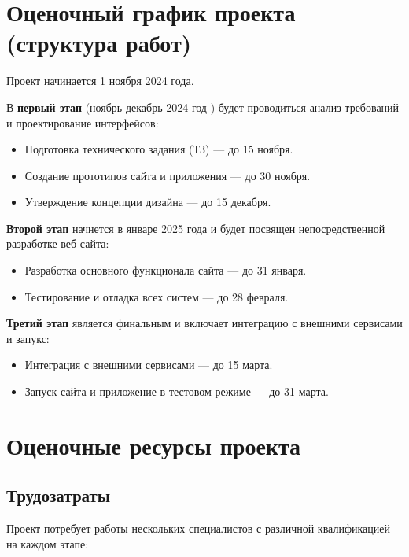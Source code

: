 \section{Оценочный график проекта (структура работ)}

Проект начинается 1 ноября 2024 года.

В \textbf{первый этап} (ноябрь-декабрь 2024 год
) будет проводиться анализ требований и проектирование интерфейсов:

\begin{itemize}
	\item Подготовка технического задания (ТЗ) --- до 15 ноября.
	\item Создание прототипов сайта и приложения --- до 30 ноября.
	\item Утверждение концепции дизайна --- до 15 декабря.
\end{itemize}

\textbf{Второй этап} начнется в январе 2025 года
и будет посвящен непосредственной разработке веб-сайта:

\begin{itemize}
	\item Разработка основного функционала сайта --- до 31 января.
	\item Тестирование и отладка всех систем --- до 28 февраля.
\end{itemize}

\textbf{Третий этап} является финальным
и включает интеграцию с внешними сервисами и запукс:

\begin{itemize}
	\item Интеграция с внешними сервисами --- до 15 марта.
	\item Запуск сайта и приложение в тестовом режиме --- до 31 марта.
\end{itemize}

\section{Оценочные ресурсы проекта}

\subsection{Трудозатраты}

Проект потребует работы нескольких специалистов с различной квалификацией на каждом этапе:

